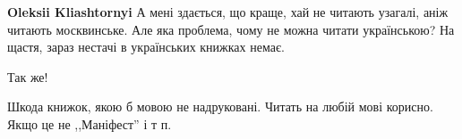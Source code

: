\begin{flushright}
\begin{minipage}{0.8\textwidth}
\textbf{Oleksii Kliashtornyi} А мені здається, що краще, хай не читають узагалі, аніж читають москвинське. Але яка проблема, чому не можна читати українською? На щастя, зараз нестачі в українських книжках немає.


 
Так же!

 

Шкода книжок, якою б мовою не надруковані. Читать на любій мові корисно. Якщо це не ,,Маніфест'' і т п.

\end{minipage}
\end{flushright}


